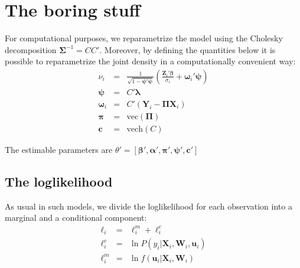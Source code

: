 \documentclass[a4paper,10pt]{article}
\newcommand{\HIP}{\texttt{HIP}}
\newcommand{\Depvar}{y_{i}}
\newcommand{\Endog}{\mathbf{Y}_{i}}
\newcommand{\Expla}{\mathbf{Z}_{i}}
\newcommand{\ExoInst}{\mathbf{X}_{i}}
\newcommand{\CSReg}{\mathbf{W}_{i}}
\newcommand{\RfDist}{\mathbf{u}_i}
\newcommand{\ScRfDist}{\bm{\omega}_i}
\newcommand{\ProbitPar}{\bm{\beta}}
\newcommand{\RfPar}{\bm{\Pi}}
\newcommand{\vRfPar}{\bm{\pi}}
\newcommand{\VarPar}{\bm{\alpha}}
\newcommand{\CondSig}{\sigma_i}
\newcommand{\Covars}{\bm{\lambda}}
\newcommand{\ScCov}{\bm{\psi}}
\newcommand{\RfVar}{\bm{\Sigma}}
\newcommand{\vechC}{\mathbf{c}}
\begin{document}


\section{The boring stuff}

For computational purposes, we reparametrize the model using the
Cholesky decomposition $\RfVar^{-1} = CC'$. Moreover, by defining the
quantities below it is possible to reparametrize the joint density in
a computationally convenient way:
\begin{eqnarray*}
  \nu_i & = & \frac{1}{\sqrt{1- \ScCov' \ScCov}}
  \left( \frac{\Expla'\ProbitPar}{\CondSig}  + \ScRfDist' \ScCov \right) \\
  \ScCov & = & C'\Covars \\
  \ScRfDist & = & C' \left(\Endog - \RfPar \ExoInst\right) \\
  \vRfPar & = & \mathrm{vec}\left(\RfPar\right) \\
  \vechC & = & \mathrm{vech}(C)
\end{eqnarray*}

The estimable parameters are $\theta' = \left[\ProbitPar', \VarPar',
  \vRfPar', \ScCov', \vechC' \right]$

\subsection{The loglikelihood}
\label{sec:loglik}

As usual in such models, we divide the loglikelihood for each
observation into a marginal and a conditional component:
\begin{eqnarray*}
  \ell_i & = & \ell^m_i + \ell^c_i \\
  \ell^c_i & = & \ln P(\Depvar | \ExoInst, \CSReg, \RfDist) \\
  \ell^m_i & = & \ln f(\RfDist | \ExoInst, \CSReg) 
\end{eqnarray*}
\end{document}
